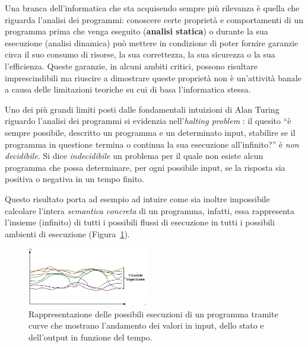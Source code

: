 Una branca dell'informatica che sta acquisendo sempre più rilevanza è quella che riguarda l'analisi dei programmi: conoscere certe proprietà e comportamenti di un programma prima che venga eseguito (\textbf{analisi statica}) o durante la sua esecuzione (analisi dinamica) può mettere in condizione di poter fornire garanzie circa il suo consumo di risorse, la sua correttezza, la sua sicurezza o la sua l'efficienza.
Queste garanzie, in alcuni ambiti critici, possono risultare imprescindibili ma riuscire a dimostrare queste proprietà non è un'attività banale a causa delle limitazioni teoriche su cui di basa l'informatica stessa.

Uno dei più grandi limiti posti dalle fondamentali intuizioni di Alan Turing riguardo l'analisi dei programmi si evidenzia nell'\textit{halting problem} \cite{Turing1936}: il quesito ``è sempre possibile, descritto un programma e un determinato input, stabilire se il programma in questione termina o continua la sua esecuzione all'infinito?'' è \textit{non decidibile}.
Si dice \textit{indecidibile} un problema per il quale non esiste alcun programma che possa determinare, per ogni possibile input, se la risposta sia positiva o negativa in un tempo finito.

Questo risultato porta ad esempio ad intuire come sia inoltre impossibile calcolare l'intera \textit{semantica concreta} di un programma, infatti, essa rappresenta l'insieme (infinito) di tutti i possibili flussi di esecuzione in tutti i possibili ambienti di esecuzione (Figura~\ref{fig:semantica_concreta}).

\begin{figure}[ht]
    \centering
    \includegraphics[width=0.47\textwidth]{figures/semantica_concreta.png}
    \caption{Rappresentazione delle possibili esecuzioni di un programma tramite curve che mostrano l'andamento dei valori in input, dello stato e dell'output in funzione del tempo.}
    \label{fig:semantica_concreta}
\end{figure}


